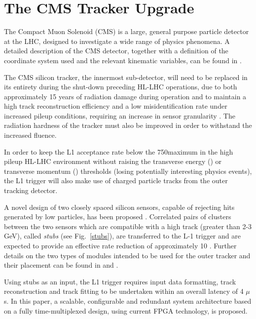 \section{The CMS Tracker Upgrade}\label{sec:tk-upgrade}

The Compact Muon Solenoid (CMS) is a large, general purpose particle detector at the LHC, designed to investigate a wide range of physics phenomena. A detailed description of the CMS detector, together with a definition of the coordinate system used and the relevant kinematic variables, can be found in \cite{oldcms}.
 
The CMS silicon tracker, the innermost sub-detector, will need to be replaced in its entirety during the shut-down preceding HL-LHC operations, due to both approximately 15 years of radiation damage during operation and to maintain a high track reconstruction efficiency and a low misidentification rate under increased pileup conditions, requiring an increase in sensor granularity \cite{P2TrackerTDR}. The radiation hardness of the tracker must also be improved in order to withstand the increased fluence.

In order to keep the L1 acceptance rate below the 750\kHz maximum in the high pileup HL-LHC environment without raising the transverse energy (\ET) or transverse momentum (\pT) thresholds (losing potentially interesting physics events), the L1 trigger will also make use of charged particle tracks from the outer tracking detector.
 
A novel design of two closely spaced silicon sensors, capable of rejecting hits generated by low \pT particles, has been proposed \cite{jjonespixel,markthesis}. Correlated pairs of clusters between the two sensors which are compatible with a high \pT track (greater than 2-3 GeV), called \textit{stubs} (see Fig.~\ref{stubs}), are transferred to the L-1 trigger and are expected to provide an effective rate reduction of approximately 10 \cite{mpessimperf,2dptmoduleconcept}. Further details on the two types of \pT modules intended to be used for the outer tracker and their placement can be found in \cite{CMS_Upgrade_TP} and \cite{P2TrackerTDR}.

Using stubs as an input, the L1 trigger requires input data formatting, track reconstruction and track fitting to be undertaken within an overall latency of 4 $\mu$s. In this paper, a scalable, configurable and redundant system architecture based on a fully time-multiplexed design, using current FPGA technology, is proposed. 

